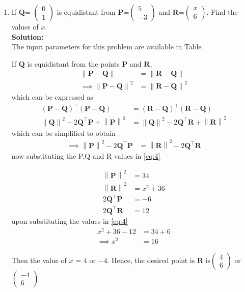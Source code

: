 \documentclass[12pt]{article}
\providecommand{\brak}[1]{\ensuremath{\left(#1\right)}}
\providecommand{\norm}[1]{\left\lVert#1\right\rVert}
\newcommand{\solution}{\noindent \textbf{Solution: }}
\newcommand{\myvec}[1]{\ensuremath{\begin{pmatrix}#1\end{pmatrix}}}
\let\vec\mathbf
\begin{document}
\begin{enumerate}

\item If $\vec{Q}$= $\myvec{0\\ 1}$  is equidistant from $\vec{P}$=$\myvec{5 \\ -3}$ and $\vec{R}$=$\myvec{x\\6}$. Find the values of $x$.\\

\solution \\
\fi
		The input parameters for this problem are available in Table
\begin{table}[ht!]\centering

\caption{}
\label{Table-1}	
\end{table}


  If $\vec{Q}$  is  equidistant from the points $\vec{P}$ and $\vec{R}$, 
\begin{align}
 \norm{\vec{P}-\vec{Q}} &=
\norm{\vec{R}-\vec{Q}} 
\\
 \implies \norm{\vec{P}-\vec{Q}}^2 &=
\norm{\vec{R}-\vec{Q}}^2 
\end{align}
which can be expressed as 
\begin{align}
 \brak{\vec{P}-\vec{Q}}^{\top} \brak{\vec{P}-\vec{Q}}&=
 \brak{\vec{R}-\vec{Q}}^{\top} 
\brak{\vec{R}-\vec{Q}}
\\ \norm{\vec{Q}}^2-2{\vec{Q}}^{\top}\vec{P} + \norm{\vec{P}}^2
 &= \norm{\vec{Q}}^2-2{\vec{Q}}^{\top}\vec{R} + \norm{\vec{R}}^2
\end{align}
which can be simplified to obtain
  \begin{align}
   \implies \norm{\vec{P}}^2-2{\vec{Q}}^{\top}\vec{P} &= \norm{\vec{R}}^2-2{\vec{Q}}^{\top}\vec{R} 
\label{eq:4} 
  \end{align}
  now substituting the P,Q and R values in \eqref{eq:4}

  \begin{align}
   \norm{\vec{P}}^2 &= 34
  \\ \norm{\vec{R}}^2 &= x^2+36
 \\2{\vec{Q}}^{\top}\vec{P} &= -6
 \\2{\vec{Q}}^{\top}\vec{R} &= 12
 \end{align}
upon   substituting the values in \eqref{eq:4}
\begin{align}
 x^2+36-12 &=34+6 
 \\ \implies  x^2 &=16
\end{align}

Then the value of $x$ = $ 4$ or $-4$.
Hence, the desired point is $\vec{R}$ is$\myvec{ 4 \\ 6}$ or $\myvec{-4\\6}$


\end{enumerate}
\end{document}
